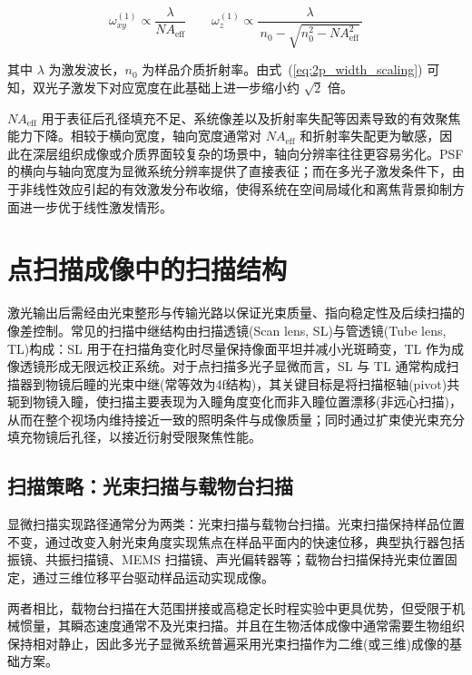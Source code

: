 \begin{equation}
  \omega_{xy}^{(1)} \propto \frac{\lambda}{NA_{\mathrm{eff}}}
  \qquad
  \omega_{z}^{(1)} \propto \frac{\lambda}{\,n_0-\sqrt{n_0^2-NA_{\mathrm{eff}}^2}\,}
  \label{eq:linear_width_scaling}
\end{equation}

其中 $\lambda$ 为激发波长，$n_0$ 为样品介质折射率。由式~(\ref{eq:2p_width_scaling}) 可知，双光子激发下对应宽度在此基础上进一步缩小约 $\sqrt2$ 倍。

$NA_{\mathrm{eff}}$ 用于表征后孔径填充不足、系统像差以及折射率失配等因素导致的有效聚焦能力下降。相较于横向宽度，轴向宽度通常对 $NA_{\mathrm{eff}}$ 和折射率失配更为敏感，因此在深层组织成像或介质界面较复杂的场景中，轴向分辨率往往更容易劣化。PSF 的横向与轴向宽度为显微系统分辨率提供了直接表征；而在多光子激发条件下，由于非线性效应引起的有效激发分布收缩，使得系统在空间局域化和离焦背景抑制方面进一步优于线性激发情形。



\section{点扫描成像中的扫描结构}\label{2.3}
激光输出后需经由光束整形与传输光路以保证光束质量、指向稳定性及后续扫描的像差控制。常见的扫描中继结构由扫描透镜(Scan lens, SL)与管透镜(Tube lens, TL)构成：SL 用于在扫描角变化时尽量保持像面平坦并减小光斑畸变，TL 作为成像透镜形成无限远校正系统。对于点扫描多光子显微而言，SL 与 TL 通常构成扫描器到物镜后瞳的光束中继(常等效为4f结构)，其关键目标是将扫描枢轴(pivot)共轭到物镜入瞳，使扫描主要表现为入瞳角度变化而非入瞳位置漂移(非远心扫描)，从而在整个视场内维持接近一致的照明条件与成像质量；同时通过扩束使光束充分填充物镜后孔径，以接近衍射受限聚焦性能。



\subsection{扫描策略：光束扫描与载物台扫描}\label{2.3.1}
显微扫描实现路径通常分为两类：光束扫描与载物台扫描。光束扫描保持样品位置不变，通过改变入射光束角度实现焦点在样品平面内的快速位移，典型执行器包括振镜、共振扫描镜、MEMS 扫描镜、声光偏转器等；载物台扫描保持光束位置固定，通过三维位移平台驱动样品运动实现成像。

两者相比，载物台扫描在大范围拼接或高稳定长时程实验中更具优势，但受限于机械惯量，其瞬态速度通常不及光束扫描。并且在生物活体成像中通常需要生物组织保持相对静止，因此多光子显微系统普遍采用光束扫描作为二维(或三维)成像的基础方案。

